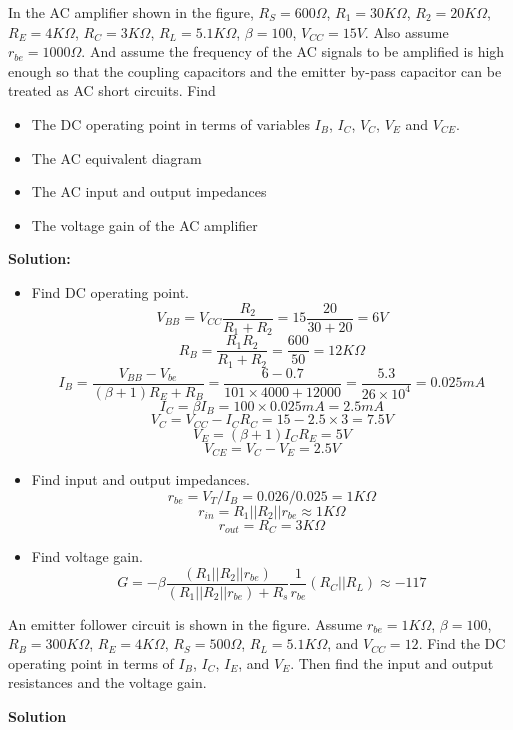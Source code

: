 \item In the AC amplifier shown in the figure, $R_S=600\Omega$, $R_1=30K\Omega$, 
$R_2=20K\Omega$, $R_E=4K\Omega$, $R_C=3K\Omega$, $R_L=5.1K\Omega$, 
$\beta=100$, $V_{CC}=15V$. Also assume $r_{be}=1000\Omega$. And assume the
frequency of the AC signals to be amplified is high enough so that the
coupling capacitors and the emitter by-pass capacitor can be treated as 
AC short circuits. Find
\begin{itemize}
\item The DC operating point in terms of variables $I_B$, $I_C$, $V_C$, $V_E$ 
  and $V_{CE}$.
\item The AC equivalent diagram
\item The AC input and output impedances
\item The voltage gain of the AC amplifier
\end{itemize}


 {\bf Solution:} 
 \begin{itemize}
 \item Find DC operating point.
 \[ V_{BB}=V_{CC}\frac{R_2}{R_1+R_2}=15\frac{20}{30+20}=6V	\]
 \[ R_B=\frac{R_1R_2}{R_1+R_2}=\frac{600}{50}=12K\Omega 	\]
 \[ I_B=\frac{V_{BB}-V_{be}}{(\beta+1)R_E+R_B}
 	=\frac{6-0.7}{101\times 4000+12000}=\frac{5.3}{26\times 10^4}
 	=0.025 mA	\]
 \[ I_C=\beta I_B=100\times 0.025 mA=2.5 mA	\]
 \[ V_C=V_{CC}-I_C R_C=15-2.5\times 3=7.5V	\]
 \[ V_E=(\beta+1)I_C R_E=5V	\]
 \[ V_{CE}=V_C-V_E=2.5V \]
 \item Find input and output impedances.
 \[	r_{be}=V_T/I_B=0.026/0.025=1K\Omega	\]
 \[	r_{in}=R_1||R_2||r_{be} \approx 1K\Omega \]
 \[	r_{out}=R_C=3K\Omega	\]

 \item Find voltage gain.
 \[	G=-\beta \frac{(R_1||R_2||r_{be})}{(R_1||R_2||r_{be})+R_s}
 	\frac{1}{r_{be}}(R_C||R_L) \approx -117	\]
 \end{itemize}

\item An emitter follower circuit is shown in the figure. Assume 
$r_{be}=1K\Omega$, $\beta=100$, $R_B=300K\Omega$, $R_E=4K\Omega$, 
$R_S=500\Omega$, $R_L=5.1K\Omega$, and $V_{CC}=12$. Find the DC operating 
point in terms of $I_B$, $I_C$, $I_E$, and $V_E$. Then find the input and 
output resistances and the voltage gain.


{\bf Solution}

